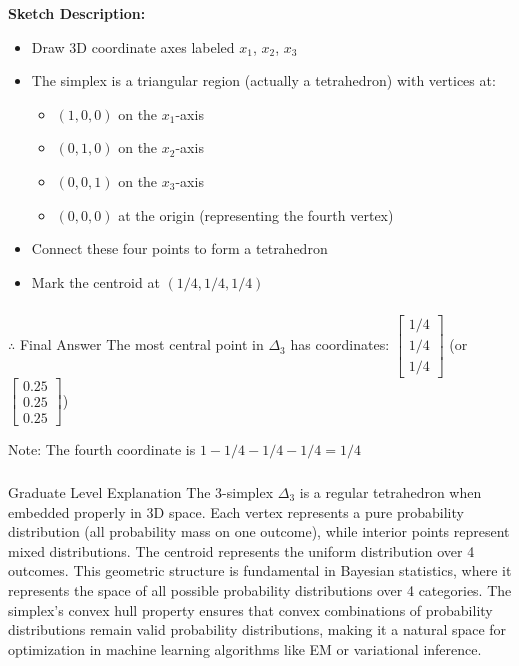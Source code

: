 \documentclass{article}
\begin{document}
{\textbf{Sketch Description:}
\begin{itemize}
\item Draw 3D coordinate axes labeled $x_1$, $x_2$, $x_3$
\item The simplex is a triangular region (actually a tetrahedron) with vertices at:
  \begin{itemize}
  \item $(1, 0, 0)$ on the $x_1$-axis
  \item $(0, 1, 0)$ on the $x_2$-axis  
  \item $(0, 0, 1)$ on the $x_3$-axis
  \item $(0, 0, 0)$ at the origin (representing the fourth vertex)
  \end{itemize}
\item Connect these four points to form a tetrahedron
\item Mark the centroid at $(1/4, 1/4, 1/4)$
\end{itemize}
}

\subsubsection*{\normalfont}{$\therefore$ Final Answer}
The most central point in $\Delta_3$ has coordinates: $\begin{bmatrix} 1/4 \\ 1/4 \\ 1/4 \end{bmatrix}$ (or $\begin{bmatrix} 0.25 \\ 0.25 \\ 0.25 \end{bmatrix}$)

Note: The fourth coordinate is $1 - 1/4 - 1/4 - 1/4 = 1/4$

\subsubsection*{\normalfont}{Graduate Level Explanation}
The 3-simplex $\Delta_3$ is a regular tetrahedron when embedded properly in 3D space. Each vertex represents a pure probability distribution (all probability mass on one outcome), while interior points represent mixed distributions. The centroid represents the uniform distribution over 4 outcomes. This geometric structure is fundamental in Bayesian statistics, where it represents the space of all possible probability distributions over 4 categories. The simplex's convex hull property ensures that convex combinations of probability distributions remain valid probability distributions, making it a natural space for optimization in machine learning algorithms like EM or variational inference.
\end{document}
